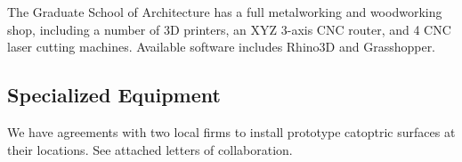 \documentclass[11pt]{article}
\begin{document}
\vspace{0.1in}
\noindent
The Graduate School of Architecture has a full metalworking and woodworking
shop, including a number of 3D printers, an XYZ 3-axis CNC router,
and 4 CNC laser cutting machines.  Available software
includes Rhino3D and Grasshopper.

\subsection*{Specialized Equipment}

We have agreements with two local firms to install prototype catoptric
surfaces at their locations.  See attached letters of collaboration.
\end{document}

